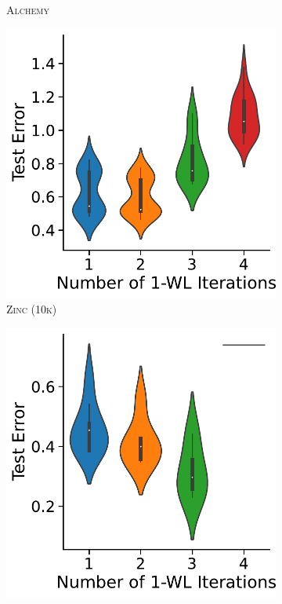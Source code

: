 \begin{figure}[thb]
\begin{subfigure}[b]{0.19\textwidth}
        \caption{\scriptsize\textsc{Alchemy}}
	\end{subfigure}
	\hfill
	\begin{subfigure}[b]{0.19\textwidth}
		\centering
		\includegraphics[width=\textwidth]{Figures/k_wl_violin_Zinc 10k.pdf}
        \caption{\scriptsize\textsc{Zinc (10k)}}
	\end{subfigure}
	\hfill
	\begin{subfigure}[b]{0.19\textwidth}
		\centering
		\includegraphics[width=\textwidth]{Figures/k_wl_violin_Zinc.pdf}

\end{subfigure}
\end{figure}

